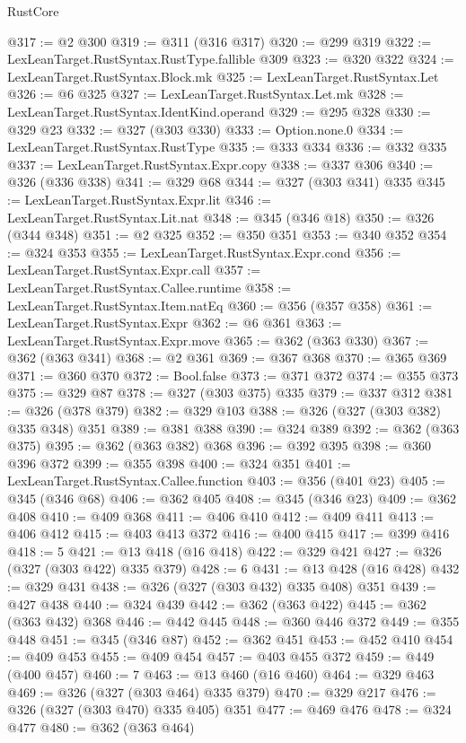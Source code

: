 \begin{lexlean}{RustCore}
\begin{coremodule}
@317 := @2 @300
@319 := @311 (@316 @317)
@320 := @299 @319
@322 := LexLeanTarget.RustSyntax.RustType.fallible @309
@323 := @320 @322
@324 := LexLeanTarget.RustSyntax.Block.mk
@325 := LexLeanTarget.RustSyntax.Let
@326 := @6 @325
@327 := LexLeanTarget.RustSyntax.Let.mk
@328 := LexLeanTarget.RustSyntax.IdentKind.operand
@329 := @295 @328
@330 := @329 @23
@332 := @327 (@303 @330)
@333 := Option.none.{0}
@334 := LexLeanTarget.RustSyntax.RustType
@335 := @333 @334
@336 := @332 @335
@337 := LexLeanTarget.RustSyntax.Expr.copy
@338 := @337 @306
@340 := @326 (@336 @338)
@341 := @329 @68
@344 := @327 (@303 @341) @335
@345 := LexLeanTarget.RustSyntax.Expr.lit
@346 := LexLeanTarget.RustSyntax.Lit.nat
@348 := @345 (@346 @18)
@350 := @326 (@344 @348)
@351 := @2 @325
@352 := @350 @351
@353 := @340 @352
@354 := @324 @353
@355 := LexLeanTarget.RustSyntax.Expr.cond
@356 := LexLeanTarget.RustSyntax.Expr.call
@357 := LexLeanTarget.RustSyntax.Callee.runtime
@358 := LexLeanTarget.RustSyntax.Item.natEq
@360 := @356 (@357 @358)
@361 := LexLeanTarget.RustSyntax.Expr
@362 := @6 @361
@363 := LexLeanTarget.RustSyntax.Expr.move
@365 := @362 (@363 @330)
@367 := @362 (@363 @341)
@368 := @2 @361
@369 := @367 @368
@370 := @365 @369
@371 := @360 @370
@372 := Bool.false
@373 := @371 @372
@374 := @355 @373
@375 := @329 @87
@378 := @327 (@303 @375) @335
@379 := @337 @312
@381 := @326 (@378 @379)
@382 := @329 @103
@388 := @326 (@327 (@303 @382) @335 @348) @351
@389 := @381 @388
@390 := @324 @389
@392 := @362 (@363 @375)
@395 := @362 (@363 @382) @368
@396 := @392 @395
@398 := @360 @396 @372
@399 := @355 @398
@400 := @324 @351
@401 := LexLeanTarget.RustSyntax.Callee.function
@403 := @356 (@401 @23)
@405 := @345 (@346 @68)
@406 := @362 @405
@408 := @345 (@346 @23)
@409 := @362 @408
@410 := @409 @368
@411 := @406 @410
@412 := @409 @411
@413 := @406 @412
@415 := @403 @413 @372
@416 := @400 @415
@417 := @399 @416
@418 := 5
@421 := @13 @418 (@16 @418)
@422 := @329 @421
@427 := @326 (@327 (@303 @422) @335 @379)
@428 := 6
@431 := @13 @428 (@16 @428)
@432 := @329 @431
@438 := @326 (@327 (@303 @432) @335 @408) @351
@439 := @427 @438
@440 := @324 @439
@442 := @362 (@363 @422)
@445 := @362 (@363 @432) @368
@446 := @442 @445
@448 := @360 @446 @372
@449 := @355 @448
@451 := @345 (@346 @87)
@452 := @362 @451
@453 := @452 @410
@454 := @409 @453
@455 := @409 @454
@457 := @403 @455 @372
@459 := @449 (@400 @457)
@460 := 7
@463 := @13 @460 (@16 @460)
@464 := @329 @463
@469 := @326 (@327 (@303 @464) @335 @379)
@470 := @329 @217
@476 := @326 (@327 (@303 @470) @335 @405) @351
@477 := @469 @476
@478 := @324 @477
@480 := @362 (@363 @464)

\end{coremodule}
\end{lexlean}
